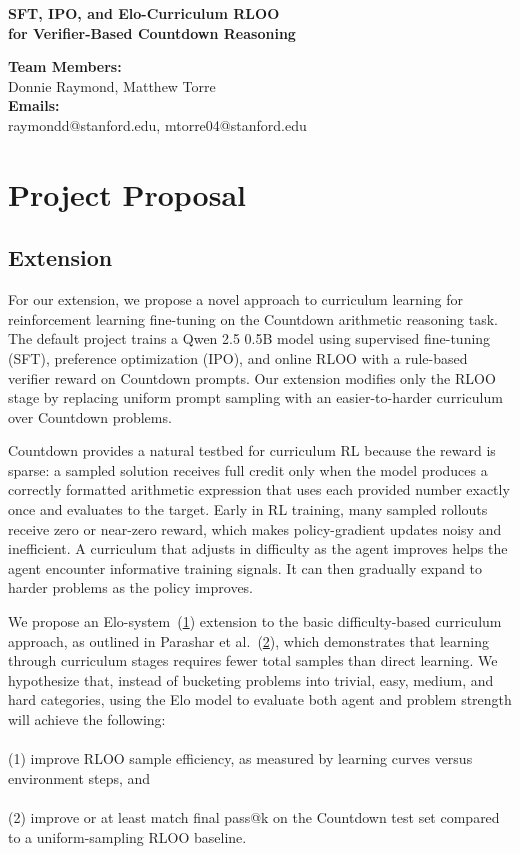 \documentclass[11pt]{article}
\makeatletter
\renewcommand{\maketitle}{
  \begin{center}
    {\bf \large
SFT, IPO, and Elo-Curriculum RLOO\\for Verifier-Based Countdown Reasoning
    }
    \vspace{0.2cm}

    {\bf Team Members:}\\
    Donnie Raymond, Matthew Torre\\[0.1cm]

    {\bf Emails:}\\
    raymondd@stanford.edu, mtorre04@stanford.edu
  \end{center}
}
\makeatother
\begin{document}
\maketitle

\section{Project Proposal}

\subsection{Extension}

For our extension, we propose a novel approach to curriculum learning for reinforcement learning fine-tuning on the Countdown arithmetic reasoning task. The default project trains a Qwen 2.5 0.5B model using supervised fine-tuning (SFT), preference optimization (IPO), and online RLOO with a rule-based verifier reward on Countdown prompts. Our extension modifies only the RLOO stage by replacing uniform prompt sampling with an easier-to-harder curriculum over Countdown problems.

Countdown provides a natural testbed for curriculum RL because the reward is sparse: a sampled solution receives full credit only when the model produces a correctly formatted arithmetic expression that uses each provided number exactly once and evaluates to the target. Early in RL training, many sampled rollouts receive zero or near-zero reward, which makes policy-gradient updates noisy and inefficient. A curriculum that adjusts in difficulty as the agent improves helps the agent encounter informative training signals. It can then gradually expand to harder problems as the policy improves.

We propose an Elo-system~(\hyperlink{elo}{1}) extension to the basic difficulty-based curriculum approach, as outlined in Parashar et al.~(\hyperlink{paper:curriculum_sampling}{2}), which demonstrates that learning through curriculum stages requires fewer total samples than direct learning. We hypothesize that, instead of bucketing problems into trivial, easy, medium, and hard categories, using the Elo model to evaluate both agent and problem strength will achieve the following: \\ \\
(1) improve RLOO sample efficiency, as measured by learning curves versus environment steps, and \\ \\
(2) improve or at least match final pass@k on the Countdown test set compared to a uniform-sampling RLOO baseline. 
\end{document}
